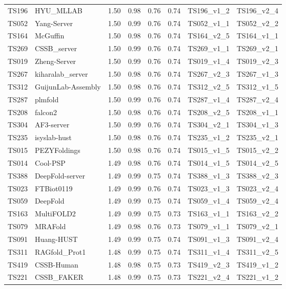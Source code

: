 \begin{longtable}{llllllll}
TS196 & HYU\_MLLAB & 1.50 & 0.98 & 0.76 & 0.74 & TS196\_v1\_2 & TS196\_v2\_4 \\ 
TS052 & Yang-Server & 1.50 & 0.99 & 0.76 & 0.74 & TS052\_v1\_1 & TS052\_v2\_2 \\ 
TS164 & McGuffin & 1.50 & 0.98 & 0.76 & 0.74 & TS164\_v2\_5 & TS164\_v1\_1 \\ 
TS269 & CSSB\_server & 1.50 & 0.99 & 0.76 & 0.74 & TS269\_v1\_1 & TS269\_v2\_1 \\ 
TS019 & Zheng-Server & 1.50 & 0.99 & 0.76 & 0.74 & TS019\_v1\_4 & TS019\_v2\_3 \\ 
TS267 & kiharalab\_server & 1.50 & 0.98 & 0.76 & 0.74 & TS267\_v2\_3 & TS267\_v1\_3 \\ 
TS312 & GuijunLab-Assembly & 1.50 & 0.98 & 0.76 & 0.74 & TS312\_v2\_5 & TS312\_v1\_5 \\ 
TS287 & plmfold & 1.50 & 0.99 & 0.76 & 0.74 & TS287\_v1\_4 & TS287\_v2\_4 \\ 
TS208 & falcon2 & 1.50 & 0.98 & 0.76 & 0.74 & TS208\_v2\_5 & TS208\_v1\_1 \\ 
TS304 & AF3-server & 1.50 & 0.99 & 0.76 & 0.74 & TS304\_v2\_1 & TS304\_v1\_3 \\ 
TS235 & isyslab-hust & 1.50 & 0.98 & 0.76 & 0.74 & TS235\_v1\_2 & TS235\_v2\_1 \\ 
TS015 & PEZYFoldings & 1.50 & 0.98 & 0.76 & 0.74 & TS015\_v1\_5 & TS015\_v2\_2 \\ 
TS014 & Cool-PSP & 1.49 & 0.98 & 0.76 & 0.74 & TS014\_v1\_5 & TS014\_v2\_5 \\ 
TS388 & DeepFold-server & 1.49 & 0.99 & 0.75 & 0.74 & TS388\_v1\_3 & TS388\_v2\_3 \\ 
TS023 & FTBiot0119 & 1.49 & 0.99 & 0.76 & 0.74 & TS023\_v1\_3 & TS023\_v2\_4 \\ 
TS059 & DeepFold & 1.49 & 0.99 & 0.75 & 0.74 & TS059\_v1\_4 & TS059\_v2\_4 \\ 
TS163 & MultiFOLD2 & 1.49 & 0.99 & 0.75 & 0.73 & TS163\_v1\_1 & TS163\_v2\_2 \\ 
TS079 & MRAFold & 1.49 & 0.98 & 0.76 & 0.73 & TS079\_v1\_1 & TS079\_v2\_1 \\ 
TS091 & Huang-HUST & 1.49 & 0.99 & 0.75 & 0.74 & TS091\_v1\_3 & TS091\_v2\_4 \\ 
TS311 & RAGfold\_Prot1 & 1.48 & 0.99 & 0.75 & 0.74 & TS311\_v1\_4 & TS311\_v2\_5 \\ 
TS419 & CSSB-Human & 1.48 & 0.98 & 0.75 & 0.73 & TS419\_v2\_3 & TS419\_v1\_2 \\ 
TS221 & CSSB\_FAKER & 1.48 & 0.99 & 0.75 & 0.73 & TS221\_v2\_4 & TS221\_v1\_2 \\ 

\end{longtable}
